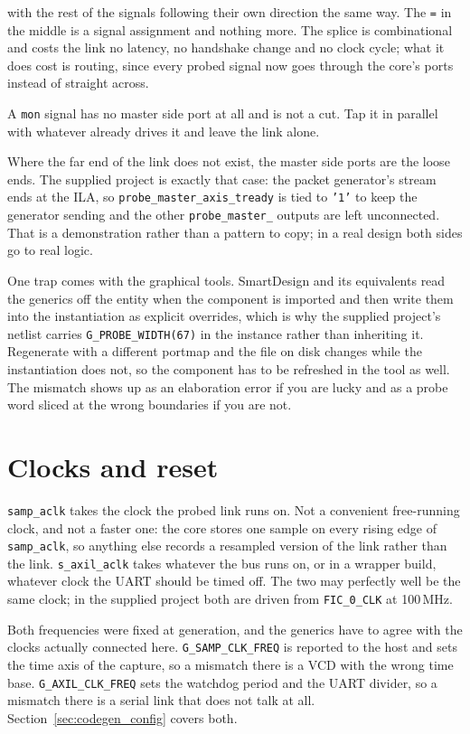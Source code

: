 \documentclass[../manual.tex]{subfiles}
\begin{document}
with the rest of the signals following their own direction the same way. The \texttt{=} in the middle is a signal assignment and nothing more. The splice is combinational and costs the link no latency, no handshake change and no clock cycle; what it does cost is routing, since every probed signal now goes through the core's ports instead of straight across.

A \texttt{mon} signal has no master side port at all and is not a cut. Tap it in parallel with whatever already drives it and leave the link alone.

Where the far end of the link does not exist, the master side ports are the loose ends. The supplied project is exactly that case: the packet generator's stream ends at the ILA, so \texttt{probe\_master\_axis\_tready} is tied to \texttt{'1'} to keep the generator sending and the other \texttt{probe\_master\_} outputs are left unconnected. That is a demonstration rather than a pattern to copy; in a real design both sides go to real logic.

One trap comes with the graphical tools. SmartDesign and its equivalents read the generics off the entity when the component is imported and then write them into the instantiation as explicit overrides, which is why the supplied project's netlist carries \texttt{G\_PROBE\_WIDTH(67)} in the instance rather than inheriting it. Regenerate with a different portmap and the file on disk changes while the instantiation does not, so the component has to be refreshed in the tool as well. The mismatch shows up as an elaboration error if you are lucky and as a probe word sliced at the wrong boundaries if you are not.

\section{Clocks and reset}
\label{sec:integ_clocks}

\texttt{samp\_aclk} takes the clock the probed link runs on. Not a convenient free-running clock, and not a faster one: the core stores one sample on every rising edge of \texttt{samp\_aclk}, so anything else records a resampled version of the link rather than the link. \texttt{s\_axil\_aclk} takes whatever the bus runs on, or in a wrapper build, whatever clock the UART should be timed off. The two may perfectly well be the same clock; in the supplied project both are driven from \texttt{FIC\_0\_CLK} at 100\,MHz.

Both frequencies were fixed at generation, and the generics have to agree with the clocks actually connected here. \texttt{G\_SAMP\_CLK\_FREQ} is reported to the host and sets the time axis of the capture, so a mismatch there is a VCD with the wrong time base. \texttt{G\_AXIL\_CLK\_FREQ} sets the watchdog period and the UART divider, so a mismatch there is a serial link that does not talk at all. Section~\ref{sec:codegen_config} covers both.
\end{document}
